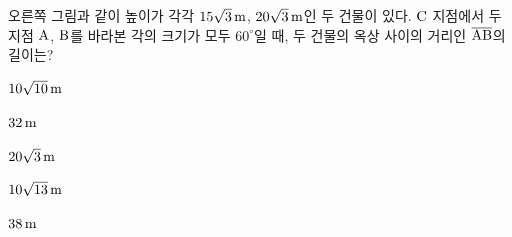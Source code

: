 \noindent\begin{minipage}[t]{0.58\linewidth}\vspace{0pt}\raggedright 오른쪽 그림과 같이 높이가 각각 $15\sqrt{3}\mkern3mu \mathrm{m}$, $20\sqrt{3}\mkern3mu \mathrm{m}$인 두 건물이 있다. $\mathrm{C}$ 지점에서 두 지점 $\mathrm{A}$, $\mathrm{B}$를 바라본 각의 크기가 모두 $60^\circ$일 때, 두 건물의 옥상 사이의 거리인 $\overline{\mathrm{AB}}$의 길이는?\end{minipage}\hfill\begin{minipage}[t]{0.4\linewidth}\vspace{0pt}\centering \resizebox{\ifdim\width>\linewidth\linewidth\else\width\fi}{!}{}\end{minipage}\par
\begin{choices32}{\rule[-3ex]{0pt}{8ex}$10\sqrt{10}\mkern3mu \mathrm{m}$}{\rule[-3ex]{0pt}{8ex}$32\mkern3mu \mathrm{m}$}{\rule[-3ex]{0pt}{8ex}$20\sqrt{3}\mkern3mu \mathrm{m}$}{\rule[-3ex]{0pt}{8ex}$10\sqrt{13}\mkern3mu \mathrm{m}$}{\rule[-3ex]{0pt}{8ex}$38\mkern3mu \mathrm{m}$}\end{choices32}
